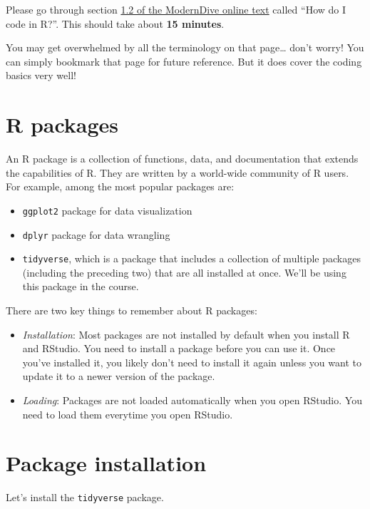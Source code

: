 \documentclass[
]{book}
\providecommand{\tightlist}{%
  \setlength{\itemsep}{0pt}\setlength{\parskip}{0pt}}
\begin{document}
Please go through section \href{https://moderndive.com/1-getting-started.html\#code}{1.2 of the ModernDive online text} called ``How do I code in R?''. This should take about \textbf{15 minutes}.

You may get overwhelmed by all the terminology on that page\ldots{} don't worry! You can simply bookmark that page for future reference. But it does cover the coding basics very well!

\section{R packages}\label{packages}

An R package is a collection of functions, data, and documentation that extends the capabilities of R. They are written by a world-wide community of R users. For example, among the most popular packages are:

\begin{itemize}
\tightlist
\item
  \texttt{ggplot2} package for data visualization
\item
  \texttt{dplyr} package for data wrangling
\item
  \texttt{tidyverse}, which is a package that includes a collection of multiple packages (including the preceding two) that are all installed at once. We'll be using this package in the course.
\end{itemize}

There are two key things to remember about R packages:

\begin{itemize}
\item
  \emph{Installation}: Most packages are not installed by default when you install R and RStudio. You need to install a package before you can use it. Once you've installed it, you likely don't need to install it again unless you want to update it to a newer version of the package.
\item
  \emph{Loading}: Packages are not loaded automatically when you open RStudio. You need to load them everytime you open RStudio.
\end{itemize}

\section{Package installation}\label{package_install}

Let's install the \texttt{tidyverse} package.
\end{document}
